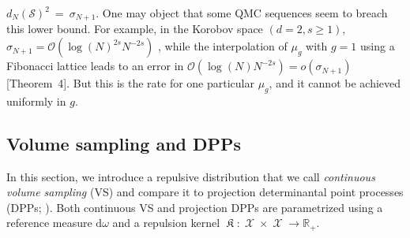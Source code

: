 \documentclass[twoside,11pt]{book}
\DeclareMathOperator*{\KDPP}{\mathfrak{K}}
\DeclareMathOperator{\X}{\mathcal{X}}
\DeclareMathOperator{\Ltwo}{\mathbb{L}_{2}(\mathrm{d} \omega)}
\newcommand{\pc}[1]{\textcolor{blue}{#1}}
\begin{document}
$d_{N}(\mathcal{S})^{2}~=~\sigma_{N+1}$.
One may object that some QMC sequences seem to breach this lower bound. For example, in the Korobov space $(d = 2, s \geq 1)$, $\sigma_{N+1} = \mathcal{O}(\log(N)^{2s} N^{-2s})$ \citep{Bac17}, while the interpolation of $\mu_{g}$ with $g = 1$ using a Fibonacci lattice leads to an error in $\mathcal{O}(\log (N) N^{-2s}) = o(\sigma_{N+1})$ \citep{BiTeYu12}[Theorem~4]. But this is the rate for one particular $\mu_{g}$, and it cannot be achieved uniformly in $g$.


\subsection{Volume sampling and DPPs}\label{sec:VS_DPP}
In this section, we introduce a repulsive distribution that we call \emph{continuous volume sampling} (VS) and compare it to projection determinantal point processes (DPPs; \citep{HoKrPeVi06}). Both continuous VS and projection DPPs are parametrized using a reference measure $\mathrm{d} \omega$ and a repulsion kernel $\KDPP : \X \times \X \rightarrow \mathbb{R}_{+}$.
\end{document}
